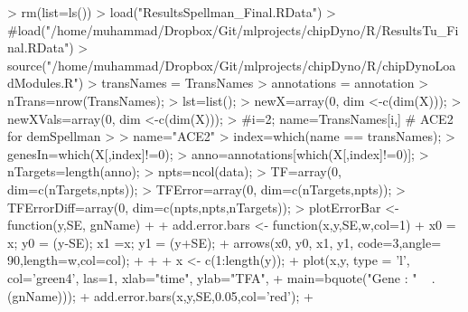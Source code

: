 \documentclass{article}
\begin{document}
\begin{Schunk}
\begin{Sinput}
> rm(list=ls())
> load("ResultsSpellman_Final.RData")
> #load("/home/muhammad/Dropbox/Git/mlprojects/chipDyno/R/ResultsTu_Final.RData")
> source("/home/muhammad/Dropbox/Git/mlprojects/chipDyno/R/chipDynoLoadModules.R")
> transNames = TransNames
> annotations = annotation
> nTrans=nrow(TransNames);
> lst=list();
> newX=array(0, dim <-c(dim(X)));
> newXVals=array(0, dim <-c(dim(X)));
> #i=2; name=TransNames[i,] # ACE2 for demSpellman
> 
> name="ACE2"
> index=which(name == transNames);
> genesIn=which(X[,index]!=0);
> anno=annotations[which(X[,index]!=0)];
> nTargets=length(anno);
> npts=ncol(data);
> TF=array(0, dim=c(nTargets,npts));
> TFError=array(0, dim=c(nTargets,npts));
> TFErrorDiff=array(0, dim=c(npts,npts,nTargets));
> plotErrorBar <- function(y,SE, gnName){
+  
+ add.error.bars <- function(x,y,SE,w,col=1){
+  x0 = x; y0 = (y-SE); x1 =x; y1 = (y+SE);
+  arrows(x0, y0, x1, y1, code=3,angle= 90,length=w,col=col);
+  }
+  
+ x <- c(1:length(y));
+ plot(x,y, type = 'l', col='green4', las=1, xlab="time", ylab="TFA", 
+       main=bquote("Gene : " ~ .(gnName)));
+ add.error.bars(x,y,SE,0.05,col='red');
+ }
\end{Sinput}
\end{Schunk}
\end{document}
